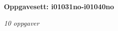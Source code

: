 \centerline{\bf Oppgavesett: i01031no-i01040no}
\vskip 10pt
\centerline{\it 10 oppgaver}\vskip 10pt
\vskip 10pt
